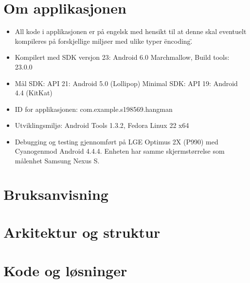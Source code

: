 \chapter{Om applikasjonen}


\begin{itemize}
\item All kode i applikasjonen er på engelsk med hensikt til at denne skal eventuelt kompileres på forskjellige miljøer med ulike typer \"encoding\". 
\item Kompilert med SDK versjon 23: Android 6.0 Marchmallow, Build tools: 23.0.0
\item Mål SDK: API 21: Android 5.0 (Lollipop) Minimal SDK: API 19: Android 4.4 (KitKat)
\item ID for applikasjonen: com.example.s198569.hangman
\item Utviklingsmiljø: Android Tools 1.3.2, Fedora Linux 22 x64
\item Debugging og testing gjennomført på LGE Optimus 2X (P990) med Cyanogenmod Android 4.4.4. Enheten har samme skjermstørrelse som målenhet Samsung Nexus S.
\end{itemize}

\chapter{Bruksanvisning}

\chapter{Arkitektur og struktur}

\chapter{Kode og løsninger}
